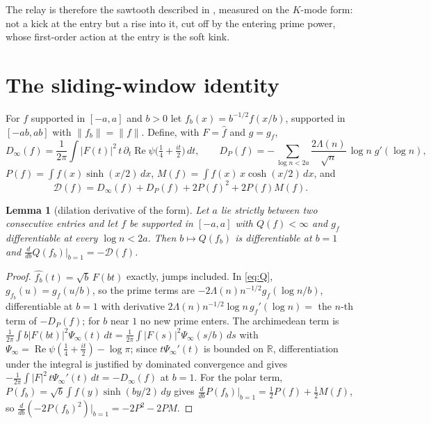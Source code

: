\documentclass[11pt]{article}
\newtheorem{lemma}[theorem]{Lemma}
\theoremstyle{definition}
\theoremstyle{remark}
\newcommand{\R}{\mathbb{R}}
\DeclareMathOperator{\Ree}{Re}
\begin{document}
The relay is therefore the sawtooth described in \cite{michaels-folds}, measured on the $K$-mode form: not a kick at the entry but a rise into it, cut off by the entering prime power, whose first-order action at the entry is the soft kink.

\section{The sliding-window identity}\label{sec:identity}

For $f$ supported in $[-a,a]$ and $b>0$ let $f_b(x)=b^{-1/2}f(x/b)$, supported in $[-ab,ab]$ with $\|f_b\|=\|f\|$. Define, with $F=\hat f$ and $g=g_f$,
\[
D_\infty(f)=\frac1{2\pi}\int|F(t)|^2\,t\,\partial_t\Ree\psi\big(\tfrac14+\tfrac{it}2\big)\,dt,\qquad
D_P(f)=-\sum_{\log n<2a}\frac{2\Lambda(n)}{\sqrt n}\,\log n\;g'(\log n),
\]
$P(f)=\int f(x)\sinh(x/2)\,dx$, $M(f)=\int f(x)\,x\cosh(x/2)\,dx$, and
\begin{equation}\label{eq:Dtilde}
\mathcal D(f)=D_\infty(f)+D_P(f)+2P(f)^2+2P(f)M(f).
\end{equation}

\begin{lemma}[dilation derivative of the form]\label{lem:dil}
Let $a$ lie strictly between two consecutive entries and let $f$ be supported in $[-a,a]$ with $Q(f)<\infty$ and $g_f$ differentiable at every $\log n<2a$. Then $b\mapsto Q(f_b)$ is differentiable at $b=1$ and $\frac{d}{db}Q(f_b)\big|_{b=1}=-\mathcal D(f)$.
\end{lemma}
\begin{proof}
$\widehat{f_b}(t)=\sqrt b\,F(bt)$ exactly, jumps included. In \eqref{eq:Q}, $g_{f_b}(u)=g_f(u/b)$, so the prime terms are $-2\Lambda(n)n^{-1/2}g_f(\log n/b)$, differentiable at $b=1$ with derivative $2\Lambda(n)n^{-1/2}\log n\,g_f'(\log n)=$ the $n$-th term of $-D_P(f)$; for $b$ near $1$ no new prime enters. The archimedean term is $\frac1{2\pi}\int b|F(bt)|^2\Psi_\infty(t)\,dt=\frac1{2\pi}\int|F(s)|^2\Psi_\infty(s/b)\,ds$ with $\Psi_\infty=\Ree\psi(\tfrac14+\tfrac{it}2)-\log\pi$; since $t\Psi_\infty'(t)$ is bounded on $\R$, differentiation under the integral is justified by dominated convergence and gives $-\frac1{2\pi}\int|F|^2\,t\Psi_\infty'(t)\,dt=-D_\infty(f)$ at $b=1$. For the polar term, $P(f_b)=\sqrt b\int f(y)\sinh(by/2)\,dy$ gives $\frac{d}{db}P(f_b)|_{b=1}=\tfrac12P(f)+\tfrac12M(f)$, so $\frac{d}{db}(-2P(f_b)^2)|_{b=1}=-2P^2-2PM$.
\end{proof}
\end{document}
